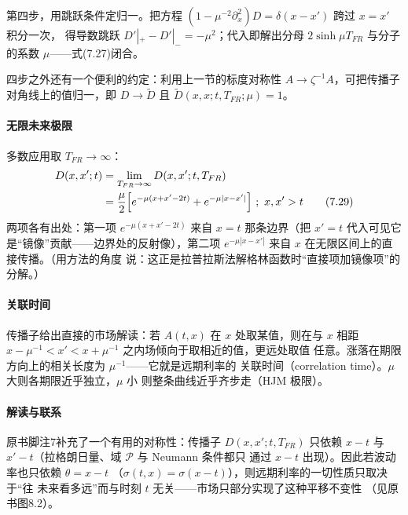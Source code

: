 第四步，用跳跃条件定归一。把方程
$(1-\mu^{-2}\partial_x^2)D=\delta(x-x')$ 跨过 $x=x'$ 积分一次，
得导数跳跃 $D'|_{+}-D'|_{-}=-\mu^{2}$；代入即解出分母
$2\sinh\mu T_{FR}$ 与分子的系数 $\mu$——式(7.27)闭合。

四步之外还有一个便利的约定：利用上一节的标度对称性
$A\to\zeta^{-1}A$，可把传播子对角线上的值归一，即
$D\to\tilde{D}$ 且 $\tilde{D}(x,x;t,T_{FR};\mu)=1$。

\paragraph{无限未来极限}
多数应用取 $T_{FR}\to\infty$：
\begin{align*}
D(x,x';t)&=\lim_{T_{FR}\to\infty}D(x,x';t,T_{FR})\\
&=\frac{\mu}{2}\Bigl[e^{-\mu(x+x'-2t)}+e^{-\mu|x-x'|}\Bigr]
\ ;\ x,x'>t
\tag{7.29}
\end{align*}
两项各有出处：第一项 $e^{-\mu(x+x'-2t)}$ 来自 $x=t$ 那条边界（把
$x'=t$ 代入可见它是“镜像”贡献——边界处的反射像），第二项
$e^{-\mu|x-x'|}$ 来自 $x$ 在无限区间上的直接传播。（用方法的角度
说：这正是拉普拉斯法解格林函数时“直接项加镜像项”的分解。）

\paragraph{关联时间}
传播子给出直接的市场解读：若 $A(t,x)$ 在 $x$ 处取某值，则在与 $x$
相距 $x-\mu^{-1}<x'<x+\mu^{-1}$ 之内场倾向于取相近的值，更远处取值
任意。涨落在期限方向上的相关长度为 $\mu^{-1}$——它就是远期利率的
关联时间（correlation time）。$\mu$ 大则各期限近乎独立，$\mu$ 小
则整条曲线近乎齐步走（HJM 极限）。

\paragraph{解读与联系}
原书脚注7补充了一个有用的对称性：传播子 $D(x,x';t,T_{FR})$ 只依赖
$x-t$ 与 $x'-t$（拉格朗日量、域 $\mathcal{P}$ 与 Neumann 条件都只
通过 $x-t$ 出现）。因此若波动率也只依赖 $\theta=x-t$
（$\sigma(t,x)=\sigma(x-t)$），则远期利率的一切性质只取决于“往
未来看多远”而与时刻 $t$ 无关——市场只部分实现了这种平移不变性
（见原书图8.2）。

